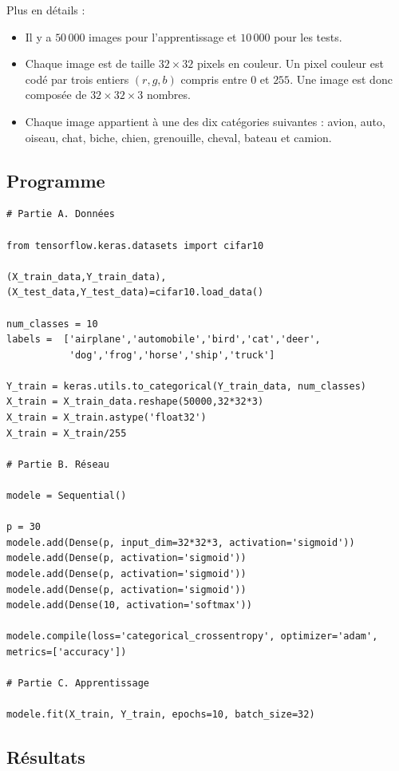 \documentclass[11pt,class=report,crop=false]{standalone}
\begin{document}
Plus en détails :
\begin{itemize}
  \item  Il y a $50\,000$ images pour l'apprentissage et $10\,000$ pour les tests.
  \item Chaque image est de taille $32\times 32$ pixels en couleur. 
  Un pixel couleur est codé par trois entiers $(r,g,b)$ compris entre $0$ et $255$.
  Une image est donc composée de $32\times32\times3$ nombres.
  
  \item Chaque image appartient à une des dix catégories suivantes : avion, auto, oiseau, chat, biche, chien, grenouille, cheval, bateau et camion.
\end{itemize}


\subsection{Programme}

\begin{lstlisting}
# Partie A. Données

from tensorflow.keras.datasets import cifar10

(X_train_data,Y_train_data),(X_test_data,Y_test_data)=cifar10.load_data()

num_classes = 10
labels =  ['airplane','automobile','bird','cat','deer',
           'dog','frog','horse','ship','truck']

Y_train = keras.utils.to_categorical(Y_train_data, num_classes)
X_train = X_train_data.reshape(50000,32*32*3)
X_train = X_train.astype('float32')
X_train = X_train/255

# Partie B. Réseau 

modele = Sequential()

p = 30
modele.add(Dense(p, input_dim=32*32*3, activation='sigmoid'))
modele.add(Dense(p, activation='sigmoid'))
modele.add(Dense(p, activation='sigmoid'))
modele.add(Dense(p, activation='sigmoid'))
modele.add(Dense(10, activation='softmax'))

modele.compile(loss='categorical_crossentropy', optimizer='adam', metrics=['accuracy'])

# Partie C. Apprentissage

modele.fit(X_train, Y_train, epochs=10, batch_size=32)
\end{lstlisting}

\subsection{Résultats}
\end{document}
